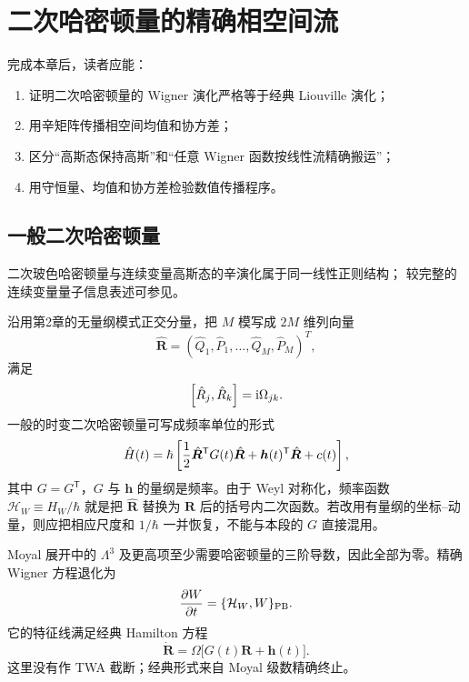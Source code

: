 \chapter{二次哈密顿量的精确相空间流}
\label{ch:quadratic}

\begin{learningobjectives}
完成本章后，读者应能：
\begin{enumerate}
  \item 证明二次哈密顿量的 Wigner 演化严格等于经典 Liouville 演化；
  \item 用辛矩阵传播相空间均值和协方差；
  \item 区分“高斯态保持高斯”和“任意 Wigner 函数按线性流精确搬运”；
  \item 用守恒量、均值和协方差检验数值传播程序。
\end{enumerate}
\end{learningobjectives}

\section{一般二次哈密顿量}

二次玻色哈密顿量与连续变量高斯态的辛演化属于同一线性正则结构；
较完整的连续变量量子信息表述可参见\cite{Weedbrook2012}。

沿用第2章的无量纲模式正交分量，把 $M$ 模写成 $2M$ 维列向量
\begin{equation}
  \hat{\bm R}=(\hat Q_1,\hat P_1,\ldots,\hat Q_M,\hat P_M)^T,
\end{equation}
满足
\begin{equation}
  \left[\hat R_j,\hat R_k\right]=\mathrm{i}\Omega_{jk}.
\end{equation}
一般的时变二次哈密顿量可写成频率单位的形式
\begin{equation}
  \hat H(t)=\hbar\left[
  \frac12\hat{\bm R}^{\mathsf T}G(t)\hat{\bm R}
  +\bm h(t)^{\mathsf T}\hat{\bm R}+c(t)\right],
  \label{eq:quadratic-hamiltonian}
\end{equation}
其中 $G=G^{\mathsf T}$，$G$ 与 $\bm h$ 的量纲是频率。由于 Weyl 对称化，频率函数 $\mathcal H_W\equiv H_W/\hbar$ 就是把 $\hat{\bm R}$ 替换为 $\bm R$ 后的括号内二次函数。若改用有量纲的坐标--动量，则应把相应尺度和 $1/\hbar$ 一并恢复，不能与本段的 $G$ 直接混用。

Moyal 展开中的 $\Lambda^3$ 及更高项至少需要哈密顿量的三阶导数，因此全部为零。精确 Wigner 方程退化为
\begin{equation}
  \frac{\partial W}{\partial t}=\{\mathcal H_W,W\}_{\mathrm{PB}}.
  \label{eq:quadratic-liouville}
\end{equation}
它的特征线满足经典 Hamilton 方程
\begin{equation}
  \dot{\bm R}=\Omega\bigl[G(t)\bm R+\bm h(t)\bigr].
  \label{eq:linear-hamilton-equation}
\end{equation}
这里没有作 TWA 截断；经典形式来自 Moyal 级数精确终止。

